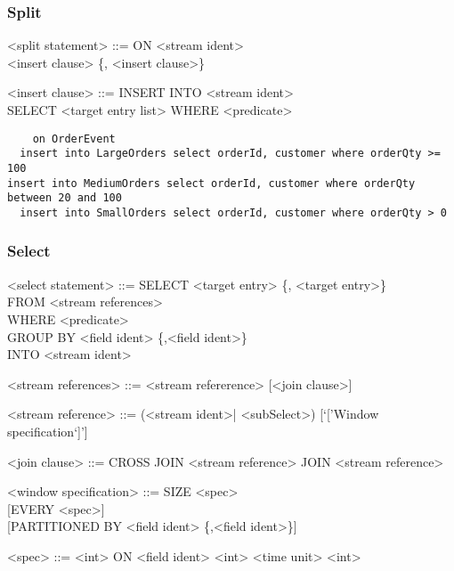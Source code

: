 \subsubsection{Split}
\begin{grammar}
<split statement> ::= ON <stream ident> \\
						<insert clause> \{, <insert clause>\}
						
<insert clause> ::= INSERT INTO <stream ident> \\SELECT <target entry list> WHERE <predicate>
\end{grammar}

\begin{verbatim}
	on OrderEvent
  insert into LargeOrders select orderId, customer where orderQty >= 100
insert into MediumOrders select orderId, customer where orderQty between 20 and 100
  insert into SmallOrders select orderId, customer where orderQty > 0
\end{verbatim}



\subsubsection{Select}
\begin{grammar}
<select statement> ::= SELECT <target entry> \{, <target entry>\}\\
	FROM <stream references> \\
	WHERE <predicate> \\
	GROUP BY <field ident> \{,<field ident>\} \\
	INTO <stream ident>
	
<stream references> ::= <stream refererence> [<join clause>]

<stream reference> ::= (<stream ident>| <subSelect>) [`['Window specification`]']

<join clause> ::= CROSS JOIN <stream reference>
				\alt [INNER] JOIN <stream reference>

<window specification> ::= 
								SIZE <spec> \\
								{ }[EVERY <spec>]\\
								{ }[PARTITIONED BY <field ident> \{,<field ident>\}]

<spec> ::= <int> ON <field ident>
			\alt <int> <time unit>
			\alt <int>
\end{grammar}




